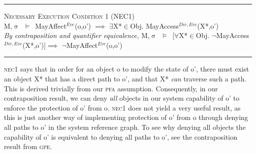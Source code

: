 \documentclass[a4paper,11pt, twoside,twocolumn]{article}
\newenvironment{logic}[1][]
{\begin{flushleft} \small }
{\end{flushleft}}
\newcommand{\loin}{$\in$}
\newcommand{\loforall}{$\forall$}
\newcommand{\loexists}{$\exists$}
\newcommand{\loimplies}{$\implies$}
\newcommand{\losigma}{$\upsigma$}
\newcommand{\loturns} {$\vDash$}
\newcommand{\loneg}{$\boldsymbol \neg$}
\newcommand{\ablock} {\null\qquad}
\begin{document}
\begin{logic}
\hrule\null
\textsc{\normalsize *Necessary Execution Condition 1 (NEC1)}\\
M,\losigma\ \loturns\ MayAffect$^{Eve}$(o,o') \loimplies\linebreak
	\ablock \loexists X*\loin{Obj}. MayAccess$^{Dir,Eve}$(X*,o') 
\linebreak\\
\textit{By contraposition and quantifier equivalence,}\linebreak
M,\losigma\ \loturns\ $[$\loforall X*\loin{Obj}. \loneg MayAccess$^{Dir,Eve}$(X*,o')$]$\loimplies\linebreak
	\ablock \loneg MayAffect$^{Eve}$(o,o') \linebreak
\hrule
\end{logic}
\textsc{nec1} says that in order for an object o to modify the state of o', there must exist an object X* that has a direct path to o', and that X* \textit{can} traverse such a path. This is derived trivially from our \textsc{pfa} assumption. Consequently, in our contraposition result, we can deny \textit{all} objects in our system capability of o' to enforce the protection of o' from o. \textsc{nec1} does not yield a very useful result, as this is just another way of implementing protection of o' from o through denying all paths to o' in the system reference graph. To see why denying all objects the capability of o' is equivalent to denying all paths to o', see the contraposition result from \textsc{gpe}.\\
\end{document}
